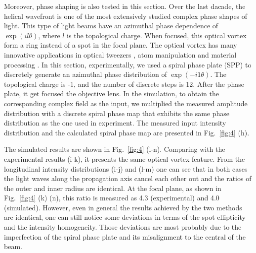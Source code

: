 \documentclass[9pt,twocolumn,twoside]{osajnl}
\begin{document}
Moreover, phase shaping is also tested in this section. Over the last dacade, the helical wavefront is one of the most extensively studied complex phase shapes of light. This type of light beams have an azimuthal phase dependence of $\exp(il\theta)$, where $l$ is the topological charge. When focused, this optical vortex form a ring instead of a spot in the focal plane. The optical vortex has many innovative applications in optical tweezers \cite{padgett2011tweezers}, atom manipulation \cite{ladavac2004microoptomechanical} and material processing \cite{hnatovsky2010materials}. In this section, experimentally, we used a spiral phase plate (SPP) to discretely generate an azimuthal phase distribution of $\exp(-i1\theta)$. The topological charge is -1, and the number of discrete steps is 12. After the phase plate, it get focused the objective lens. In the simulation, to obtain the corresponding complex field as the input, we multiplied the measured amplitude distribution with a discrete spiral phase map that exhibits the same phase distribution as the one used in experiment. The measured input intensity distribution and the calculated spiral phase map are presented in Fig.~\ref{fig:4} (h).

The simulated results are shown in Fig.~\ref{fig:4} (l-n). Comparing with the experimental results (i-k), it presents the same optical vortex feature. From the longitudinal intensity distributions (i-j) and (l-m) one can see that in both cases the light waves along the propagation axis cancel each other out and the ratios of the outer and inner radius are identical. At the focal plane, as shown in Fig.~\ref{fig:4} (k) (n), this ratio is measured as 4.3 (experimental) and 4.0 (simulated). However, even in general the results achieved by the two methods are identical, one can still notice some deviations in terms of the spot ellipticity and the intensity homogeneity. Those deviations are most probably due to the imperfection of the spiral phase plate and its misalignment to the central of the beam.          
\end{document}
